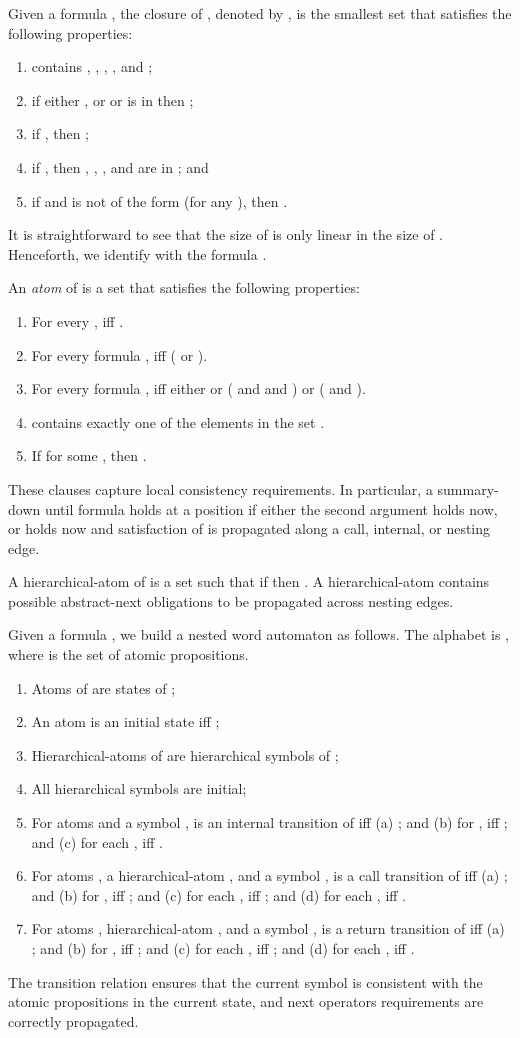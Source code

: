 \documentclass{LMCS}
\theoremstyle{plain}
\theoremstyle{definition}
\begin{document}
Given a formula , the closure of , denoted by
, is the smallest set that satisfies the following
properties: 
\begin{enumerate}[]
\item
 contains , , ,
, and ; 
\item
if either , or  or
 is in  then ; 
\item 
if , then ;
\item
if , then , ,
, and 
 are in
; and
\item
if  and  is not of
the form  (for any ), then . 
\end{enumerate}
It is straightforward to see that the size of
 is only linear in the size of .  Henceforth,
we identify  with the formula .

An \emph{atom} of  is a set 
that satisfies the following properties:
\begin{enumerate}[]
 \item For every , 
            iff  .
 \item For every formula ,
            iff ( or ).
 \item 
       For every formula ,
            iff
           either  or ( and  and
                      ) or
 ( and ).
 \item  contains exactly one of the elements in the set .
\item If  for some , then .
\end{enumerate}
These clauses capture local consistency requirements.
In particular, a summary-down until formula  holds at a position if either
the second argument  holds now, or  holds now and satisfaction of 
is propagated along a call, internal, or nesting edge.

A hierarchical-atom of  is a set  such that
if  then .
A hierarchical-atom contains possible abstract-next obligations to be propagated across
nesting edges.

Given a formula , we build a nested word automaton  as follows.
The alphabet  is , where  is the set of atomic
propositions. 
\begin{enumerate}[(1)]
\item
Atoms of  are states of ;
\item
An atom  is an initial state iff ;
\item
Hierarchical-atoms of  are hierarchical symbols of ;
\item
All hierarchical symbols are initial;
\item
For atoms  and a symbol ,
 is an internal transition of  iff
(a) ; and
(b) for ,  iff ; and
(c) for each ,
 iff .
\item
For atoms , a hierarchical-atom , and a symbol ,
 is a call transition of  iff
(a) ; and
(b) for ,  iff ; and
(c) for each ,
 iff ; and
(d) for each ,
 iff .
\item
For atoms , hierarchical-atom , and a symbol ,
 is a return transition of  iff
(a) ; and
(b) for ,  iff ; and
(c) for each ,
 iff ; and
(d) for each ,
 iff .

\end{enumerate}
The transition relation ensures that the current symbol is consistent
with the atomic propositions in the current state, and next operators
requirements are correctly propagated.
\end{document}
